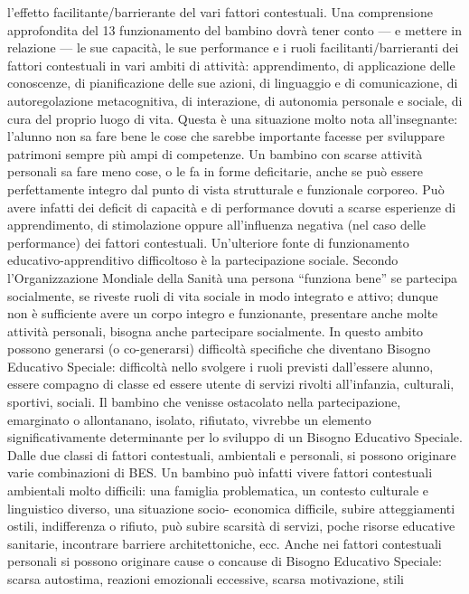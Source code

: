 l’effetto facilitante/barrierante del vari fattori contestuali. Una comprensione approfondita del
13
funzionamento del bambino dovrà tener conto — e mettere in relazione — le sue capacità, le sue
performance e i ruoli facilitanti/barrieranti dei fattori contestuali in vari ambiti di attività:
apprendimento, di applicazione delle conoscenze, di pianificazione delle sue azioni, di linguaggio e
di comunicazione, di autoregolazione metacognitiva, di interazione, di autonomia personale e
sociale, di cura del proprio luogo di vita. Questa è una situazione molto nota all’insegnante:
l'alunno non sa fare bene le cose che sarebbe importante facesse per sviluppare patrimoni sempre
più ampi di competenze. Un bambino con scarse attività personali sa fare meno cose, o le fa in
forme deficitarie, anche se può essere perfettamente integro dal punto di vista strutturale e
funzionale corporeo. Può avere infatti dei deficit di capacità e di performance dovuti a scarse
esperienze di apprendimento, di stimolazione oppure all’influenza negativa (nel caso delle
performance) dei fattori contestuali.
Un’ulteriore fonte di funzionamento educativo-apprenditivo difficoltoso è la partecipazione
sociale. Secondo l’Organizzazione Mondiale della Sanità una persona “funziona bene” se partecipa
socialmente, se riveste ruoli di vita sociale in modo integrato e attivo; dunque non è sufficiente
avere un corpo integro e funzionante, presentare anche molte attività personali, bisogna anche
partecipare socialmente. In questo ambito possono generarsi (o co-generarsi) difficoltà specifiche
che diventano Bisogno Educativo Speciale: difficoltà nello svolgere i ruoli previsti dall’essere
alunno, essere compagno di classe ed essere utente di servizi rivolti all’infanzia, culturali, sportivi,
sociali. Il bambino che venisse ostacolato nella partecipazione, emarginato o allontanano, isolato,
rifiutato, vivrebbe un elemento significativamente determinante per lo sviluppo di un Bisogno
Educativo Speciale.
Dalle due classi di fattori contestuali, ambientali e personali, si possono originare varie
combinazioni di BES. Un bambino può infatti vivere fattori contestuali ambientali molto difficili:
una famiglia problematica, un contesto culturale e linguistico diverso, una situazione socio-
economica difficile, subire atteggiamenti ostili, indifferenza o rifiuto, può subire scarsità di servizi,
poche risorse educative sanitarie, incontrare barriere architettoniche, ecc.
Anche nei fattori contestuali personali si possono originare cause o concause di Bisogno
Educativo Speciale: scarsa autostima, reazioni emozionali eccessive, scarsa motivazione, stili
